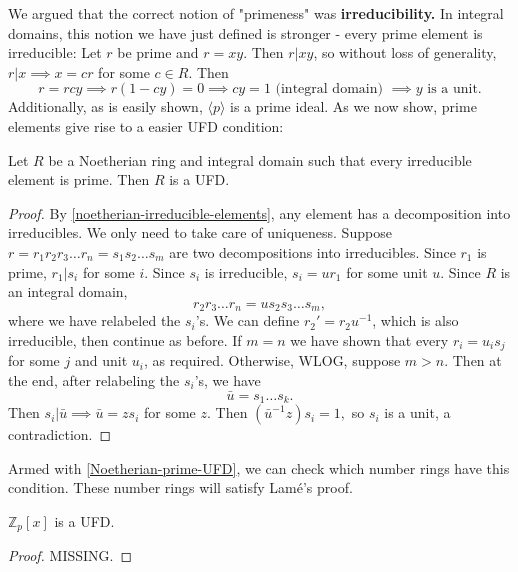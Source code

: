 We argued that the correct notion of "primeness" was \textbf{irreducibility.} In integral domains, this notion we have just defined is stronger - every prime element is irreducible: Let $r$ be prime and $r=xy$. Then $r|xy$, so without loss of generality, $r|x\implies x=cr$ for some $c\in R$. Then $$r=rcy\implies r(1-cy)=0\implies cy=1 \text{ (integral domain) }\implies y \text{ is a unit.}$$ Additionally, as is easily shown, $\langle p \rangle$ is a prime ideal. As we now show, prime elements give rise to a easier UFD condition:

\begin{proposition}\label{Noetherian-prime-UFD}
Let $R$ be a Noetherian ring and integral domain such that every irreducible element is prime. Then $R$ is a UFD.
\end{proposition}
\begin{proof}
By \cref{noetherian-irreducible-elements}, any element has a decomposition into irreducibles. We only need to take care of uniqueness. Suppose $r=r_1r_2r_3\dots r_n=s_1s_2\dots s_m$ are two decompositions into irreducibles. Since $r_1$ is prime, $r_1|s_i$ for some $i$. Since $s_i$ is irreducible, $s_i=ur_1$ for some unit $u$. Since $R$ is an integral domain, $$r_2r_3\dots r_n=us_2s_3\dots s_m,$$ where we have relabeled the $s_i$'s. We can define $r_2'=r_2u^{-1}$, which is also irreducible, then continue as before. If $m=n$ we have shown that every $r_i=u_is_j$ for some $j$ and unit $u_i$, as required. Otherwise, WLOG, suppose $m>n$. Then at the end, after relabeling the $s_i$'s, we have
$$\bar u= s_1\dots s_k.$$ Then $s_i|\bar{u}\implies \bar{u}=zs_i$ for some $z$. Then $(\bar{u}^{-1}z)s_i=1,$ so $s_i$ is a unit, a contradiction.
\end{proof}

Armed with \cref{Noetherian-prime-UFD}, we can check which number rings have this condition. These number rings will satisfy Lamé's proof.

\begin{proposition}\label{Z_p[x]-is-UFD}
$\mathbb{Z}_p[x]$ is a UFD. 
\end{proposition}
\begin{proof}
MISSING.
\end{proof}


